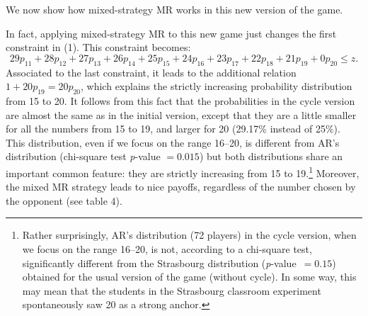 \begin{Article}
\begin{refsection}[Umbhauer]
We now show how mixed-strategy MR works in this new version of the game.

In fact, applying mixed-strategy MR to this new game just changes the
first constraint in (1). This constraint becomes:
\[
29p_{11} + 28p_{12} + 27p_{13} + 26p_{14} + 25p_{15} + 24p_{16} + 23p_{17} + 22p_{18} + 21p_{19} + 0p_{20} \leq z.
\]
Associated to the last constraint, it leads to the additional relation
\(1 + 20p_{19} = 20p_{20}\), which explains the strictly increasing
probability distribution from 15 to 20. It follows from this fact that
the probabilities in the cycle version are almost the same as in the
initial version, except that they are a little smaller for all the
numbers from 15 to 19, and larger for 20 (29.17\% instead of 25\%). This
distribution, even if we focus on the range 16--20, is different from
AR's distribution (chi-square test \emph{p}-value $=0.015$) but both
distributions share an important common feature: they are strictly
increasing from 15 to 19.\footnote{Rather surprisingly, AR's
  distribution (72 players) in the cycle version, when we focus on the
  range 16--20, is not, according to a chi-square test, significantly
  different from the Strasbourg distribution (\emph{p}-value~$= 0.15$) obtained
  for the usual version of the game (without cycle). In some way, this
  may mean that the students in the Strasbourg classroom experiment
  spontaneously saw 20 as a strong anchor.} Moreover, the mixed MR
strategy leads to nice payoffs, regardless of the number chosen by the
opponent (see table 4).

\begin{table}[h!]
\caption{AR's experimental distribution, mixed minimax regret
strategy,\\ symmetric Nash equilibrium and mean minimax regret payoff\\ in
the AR's cycle version}\label{tab4}
\centering
{}
\end{table}


\end{refsection}
\end{Article}
